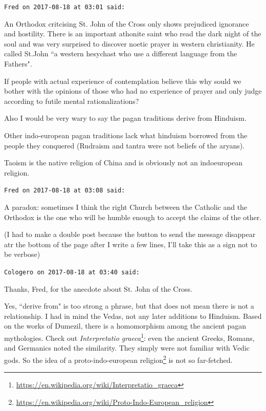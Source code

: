 \begin{footnotesize}\begin{sffamily}



\texttt{Fred on 2017-08-18 at 03:01 said: }

An Orthodox critcising St. John of the Cross only shows prejudiced ignorance and hostility. There is an important athonite saint who read the dark night of the soul and was very surprised to discover noetic prayer in western christianity. He called St.John ``a western hesychast who use a different language from the Fathers".

If people with actual experience of contemplation believe this why sould we bother with the opinions of those who had no experience of prayer and only judge according to futile mental rationalizations?

Also I would be very wary to say the pagan traditions derive from Hinduism.

Other indo-european pagan traditions lack what hinduism borrowed from the people they conquered (Rudraism and tantra were not beliefs of the aryans).

Taoism is the native religion of China and is obviously not an indoeuropean religion.


\hfill

\texttt{Fred on 2017-08-18 at 03:08 said: }

A paradox: sometimes I think the right Church between the Catholic and the Orthodox is the one who will be humble enough to accept the claims of the other.

(I had to make a double post because the button to send the message disappear atr the bottom of the page after I write a few lines, I'll take this as a sign not to be verbose)


\hfill

\texttt{Cologero on 2017-08-18 at 03:40 said: }

Thanks, Fred, for the anecdote about St. John of the Cross.

Yes, ``derive from" is too strong a phrase, but that does not mean there is not a relationship. I had in mind the Vedas, not any later additions to Hinduism. Based on the works of Dumezil, there is a homomorphism among the ancient pagan mythologies. Check out \textit{Interpretatio graeca}\footnote{\url{https://en.wikipedia.org/wiki/Interpretatio_graeca}}: even the ancient Greeks, Romans, and Germanics noted the similarity. They simply were not familiar with Vedic gods. So the idea of a proto-indo-european religion\footnote{\url{https://en.wikipedia.org/wiki/Proto-Indo-European_religion}} is not so far-fetched.


\end{sffamily}
\end{footnotesize}
